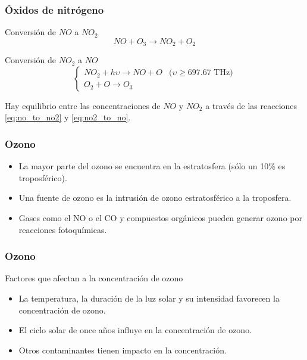 \documentclass[12pt]{beamer}
\begin{document}
\begin{frame}
\frametitle{Óxidos de nitrógeno}
\begin{block}{Conversión de $NO$ a $NO_{2}$}
\begin{equation}
NO + O_{3} \rightarrow NO_{2} + O_{2}
\label{eq:no_to_no2}
\end{equation}
\end{block}

\pause

\begin{block}{Conversión de $NO_{2}$ a $NO$}
\begin{equation}
\begin{cases}
NO_{2} + h\upsilon \rightarrow NO + O &\text{($\upsilon \geq 697.67$ THz)}\\
O_{2} + O \rightarrow O_{3} & 
\end{cases} 
\label{eq:no2_to_no}
\end{equation}
\end{block}

\pause

Hay equilibrio entre las concentraciones de $NO$ y $NO_{2}$ a través de las reacciones \ref{eq:no_to_no2} y \ref{eq:no2_to_no}.
\end{frame}

\begin{frame}
\frametitle{Ozono}
\begin{itemize}
\item<1-> La mayor parte del ozono se encuentra en la estratosfera (sólo un 10\% es troposférico).
\item<2-> Una fuente de ozono es la intrusión de ozono estratosférico a la troposfera.
\item<3-> Gases como el NO o el CO y compuestos orgánicos pueden generar ozono por reacciones fotoquímicas.
\end{itemize}
\end{frame}

\begin{frame}
\frametitle{Ozono}
\begin{block}{Factores que afectan a la concentración de ozono}
\begin{itemize}
\item<1-> La temperatura, la duración de la luz solar y su intensidad favorecen la concentración de ozono.
\item<2-> El ciclo solar de once años influye en la concentración de ozono.
\item<3-> Otros contaminantes tienen impacto en la concentración.
\end{itemize}
\end{block}
\end{frame}
\end{document}
